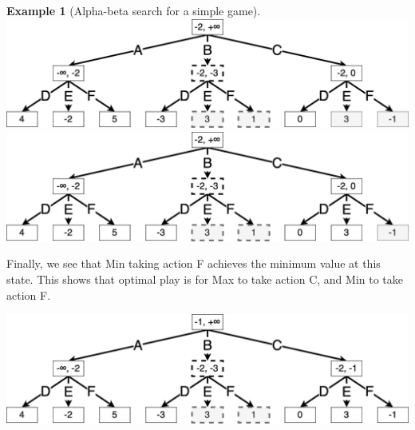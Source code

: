 \documentclass[
  letterpaper,
  DIV=11,
  numbers=noendperiod]{scrreprt}
\theoremstyle{plain}
\theoremstyle{plain}
\theoremstyle{definition}
\newtheorem{example}{Example}[chapter]
\theoremstyle{definition}
\theoremstyle{remark}
\begin{document}
\begin{example}[Alpha-beta search for a simple
game]
\includegraphics{./shared/alpha-beta-7.png}
\includegraphics{./shared/alpha-beta-8.png}

Finally, we see that Min taking action F achieves the minimum value at
this state. This shows that optimal play is for Max to take action C,
and Min to take action F.

\includegraphics{./shared/alpha-beta-9.png}

\end{example}
\end{document}
